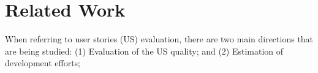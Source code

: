 


\section{Related Work}
\label{sec-relatedwork}
When referring to user stories (US) evaluation, there are two main directions that are being studied: (1) Evaluation of the US quality; and
(2) Estimation of development efforts; 



